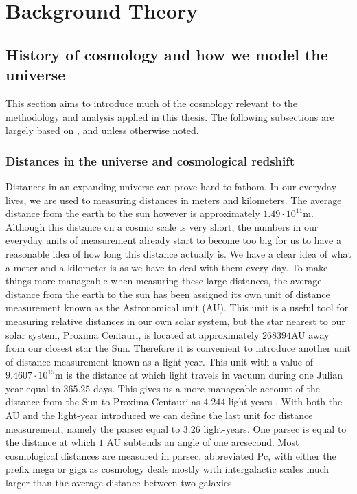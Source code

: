 \chapter{Background Theory}\label{sec:backgroundtheory}
\section{History of cosmology and how we model the universe}
This section aims to introduce much of the cosmology relevant to the methodology and analysis applied in this thesis.
The following subsections are largely based on \cite{schneider2006extragalactic}, \cite{Dodelson:1282338} and \cite{ryden2017introduction} unless otherwise noted.
\subsection{Distances in the universe and cosmological redshift}\label{sec:sec_distance}
Distances in an expanding universe can prove hard to fathom. In our everyday
lives, we are used to measuring distances in meters and kilometers. The
average distance from the earth to the sun however is approximately $1.49\cdot10^{11}$m.
Although this distance on a cosmic scale is very short, the numbers in our
everyday units of measurement already start to become too big for us to have a
reasonable idea of how long this distance actually is. We have a clear idea of
what a meter and a kilometer is as we have to deal with them every day. To make
things more manageable when measuring these large distances, the average distance
from the earth to the sun has been assigned its own unit of distance measurement known as the
Astronomical unit (AU). This unit is a useful tool for measuring relative
distances in our own solar system, but the star nearest to our solar system, Proxima Centauri, is
located at approximately $268394$AU away from our closest star the Sun.
Therefore it is convenient to introduce another unit of distance measurement known as a light-year. This unit with a value of $9.4607\cdot10^{15}$m is the distance at
which light travels in vacuum during one Julian year equal to $365.25$ days.
This gives us a more manageable account of the distance from the Sun to Proxima
Centauri as $4.244$ light-years \cite{Brown2020GaiaED}. With both the AU and the light-year introduced
we can define the last unit for distance measurement, namely the parsec equal to $3.26$
light-years. One parsec is equal to the distance at which $1$ AU subtends an angle
of one arcsecond. Most
cosmological distances are measured in parsec, abbreviated Pc, with either the
prefix mega or giga as cosmology deals mostly with intergalactic scales much
larger than the average distance between two galaxies.\\

